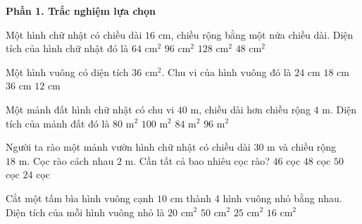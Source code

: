\textbf{Phần 1. Trắc nghiệm lựa chọn}

\begin{ex} %
Một hình chữ nhật có chiều dài $16\text{ cm}$, chiều rộng bằng một nửa chiều dài. Diện tích của hình chữ nhật đó là
\choice
{$64\text{ cm}^2$}
{$96\text{ cm}^2$}
{\True $128\text{ cm}^2$}
{$48\text{ cm}^2$}
\end{ex}

\begin{ex} %
Một hình vuông có diện tích $36\text{ cm}^2$. Chu vi của hình vuông đó là
\choice
{\True $24\text{ cm}$}
{$18\text{ cm}$}
{$36\text{ cm}$}
{$12\text{ cm}$}
\end{ex}

\begin{ex} %
Một mảnh đất hình chữ nhật có chu vi $40\text{ m}$, chiều dài hơn chiều rộng $4\text{ m}$. Diện tích của mảnh đất đó là
\choice
{$80\text{ m}^2$}
{$100\text{ m}^2$}
{$84\text{ m}^2$}
{\True $96\text{ m}^2$}
\end{ex}

\begin{ex} %
Người ta rào một mảnh vườn hình chữ nhật có chiều dài $30\text{ m}$ và chiều rộng $18\text{ m}$. Cọc rào cách nhau $2\text{ m}$. Cần tất cả bao nhiêu cọc rào?
\choice
{$46$ cọc}
{\True $48$ cọc}
{$50$ cọc}
{$24$ cọc}
\end{ex}

\begin{ex} %
Cắt một tấm bìa hình vuông cạnh $10\text{ cm}$ thành 4 hình vuông nhỏ bằng nhau. Diện tích của mỗi hình vuông nhỏ là
\choice
{$20\text{ cm}^2$}
{$50\text{ cm}^2$}
{\True $25\text{ cm}^2$}
{$16\text{ cm}^2$}
\end{ex}

